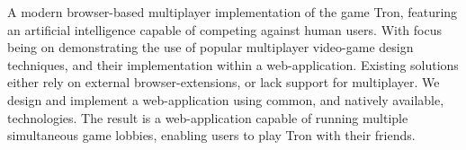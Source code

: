 \documentclass{standalone}
\begin{document}
	A modern browser-based multiplayer implementation of the game Tron, featuring an artificial intelligence capable of competing against human users. With focus being on demonstrating the use of popular multiplayer video-game design techniques, and their implementation within a web-application. Existing solutions either rely on external browser-extensions, or lack support for multiplayer. We design and implement a web-application using common, and natively available, technologies. The result is a web-application capable of running multiple simultaneous game lobbies, enabling users to play Tron with their friends.
\end{document}

